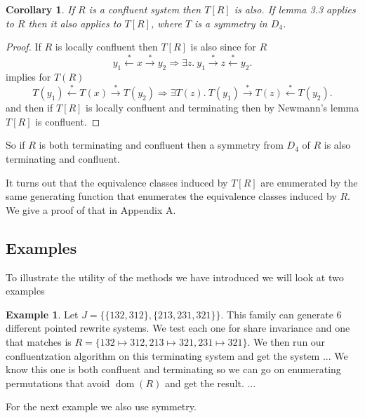 \documentclass[a4paper, 11pt, english]{article}
\newcommand{\patternrule}{ \mapsto \!}
\newtheorem{corollary}[theorem]{Corollary}
\theoremstyle{definition}
\newtheorem{example}[theorem]{Example}
\newcommand{\from}{\leftarrow}
\newcommand{\tostar}{\stackrel{*}{\to}}
\newcommand{\fromstar}{\stackrel{*}{\from}}
\DeclareMathOperator{\dom}{dom}
\begin{document}
\begin{corollary}
    If $R$ is a confluent system then $T[R]$ is also. If lemma 3.3 applies to
    $R$ then it also applies to $T[R]$, where $T$ is a symmetry in $D_4$.
\end{corollary}
\begin{proof}
    If $R$ is locally confluent then $T[R]$ is also since for $R$
    \[
        y_1 \fromstar x \tostar y_2 \Longrightarrow \exists z. \  y_1 \tostar z \fromstar y_2.
    \]
    implies for $T(R)$
    \[ 
        T(y_1) \fromstar T(x) \tostar T(y_2) \Longrightarrow \exists T(z). \
        T(y_1) \tostar T(z) \fromstar T(y_2).
    \]
    and then if $T[R]$ is locally confluent and terminating then by Newmann's
    lemma $T[R]$ is confluent.
\end{proof}

So if $R$ is both terminating and confluent then a symmetry from $D_4$ of $R$ is also terminating and
confluent.

It turns out that the equivalence classes induced by $T[R]$ are enumerated by
the same generating function that enumerates the equivalence classes induced by
$R$. We give a proof of that in Appendix A.

\subsection{Examples}
To illustrate the utility of the methods we have introduced we will look at two
examples

\begin{example}
Let $J=\{\{ 132, 312 \}, \{ 213, 231, 321 \}\}$. This family can generate 6
different pointed rewrite systems. We test each one for share invariance and one that
matches is $R=\{ 132 \patternrule 312, 213 \patternrule 321, 231 \patternrule
321 \}$. We then run our confluentzation algorithm on this terminating system
and get the system
...
We know this one is both confluent and terminating so we can go on enumerating
permutations that avoid $\dom(R)$ and get the result.
...
\end{example}

For the next example we also use symmetry.
\end{document}
